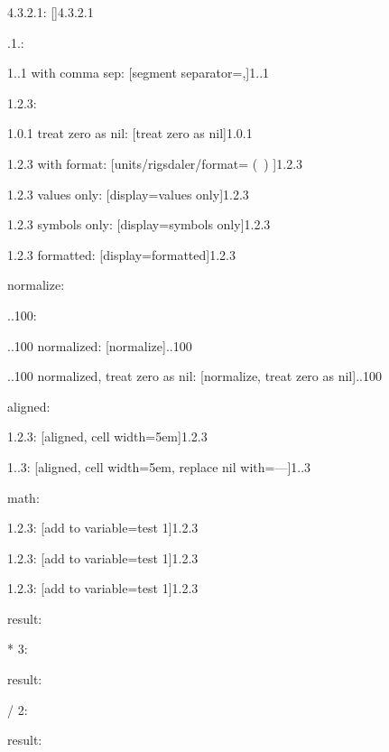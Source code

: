 \documentclass{article}
\begin{document}
4.3.2.1: \hfill {}[]{4.3.2.1}

.1.: \hfill {}

1..1 with comma sep: \hfill {}[segment separator={,}]{1..1}

1.2.3: \hfill {}

1.0.1 treat zero as nil: \hfill {}[treat zero as nil]{1.0.1}

1.2.3 with format: \hfill {}[units/rigsdaler/format={ (\SYMBOL\ \VALUE) }]{1.2.3}

1.2.3 values only: \hfill {}[display=values only]{1.2.3}

1.2.3 symbols only: \hfill {}[display=symbols only]{1.2.3}

1.2.3 formatted: \hfill {}[display=formatted]{1.2.3}

normalize:

..100: \hfill {}

..100 normalized: \hfill {}[normalize]{..100}

..100 normalized, treat zero as nil: \hfill {}[normalize, treat zero as nil]{..100}

aligned:

1.2.3: \hfill {}[aligned, cell width=5em]{1.2.3}

1..3: \hfill {}[aligned, cell width=5em, replace nil with={---}]{1..3}

math:

1.2.3: \hfill {}[add to variable=test 1]{1.2.3}

1.2.3: \hfill {}[add to variable=test 1]{1.2.3}

1.2.3: \hfill {}[add to variable=test 1]{1.2.3}

result: \hfill {}

* 3: \hfill {}

result: \hfill {}

/ 2: \hfill {}

result: \hfill {}
\end{document}
